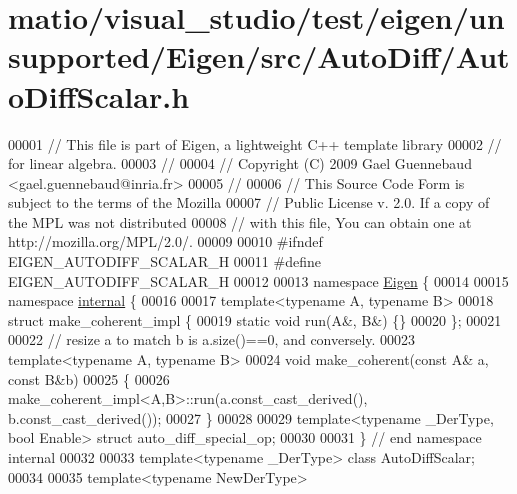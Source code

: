 \hypertarget{matio_2visual__studio_2test_2eigen_2unsupported_2_eigen_2src_2_auto_diff_2_auto_diff_scalar_8h_source}{}\section{matio/visual\+\_\+studio/test/eigen/unsupported/\+Eigen/src/\+Auto\+Diff/\+Auto\+Diff\+Scalar.h}
\label{matio_2visual__studio_2test_2eigen_2unsupported_2_eigen_2src_2_auto_diff_2_auto_diff_scalar_8h_source}

\begin{DoxyCode}
00001 \textcolor{comment}{// This file is part of Eigen, a lightweight C++ template library}
00002 \textcolor{comment}{// for linear algebra.}
00003 \textcolor{comment}{//}
00004 \textcolor{comment}{// Copyright (C) 2009 Gael Guennebaud <gael.guennebaud@inria.fr>}
00005 \textcolor{comment}{//}
00006 \textcolor{comment}{// This Source Code Form is subject to the terms of the Mozilla}
00007 \textcolor{comment}{// Public License v. 2.0. If a copy of the MPL was not distributed}
00008 \textcolor{comment}{// with this file, You can obtain one at http://mozilla.org/MPL/2.0/.}
00009 
00010 \textcolor{preprocessor}{#ifndef EIGEN\_AUTODIFF\_SCALAR\_H}
00011 \textcolor{preprocessor}{#define EIGEN\_AUTODIFF\_SCALAR\_H}
00012 
00013 \textcolor{keyword}{namespace }\hyperlink{namespace_eigen}{Eigen} \{
00014 
00015 \textcolor{keyword}{namespace }\hyperlink{namespaceinternal}{internal} \{
00016 
00017 \textcolor{keyword}{template}<\textcolor{keyword}{typename} A, \textcolor{keyword}{typename} B>
00018 \textcolor{keyword}{struct }make\_coherent\_impl \{
00019   \textcolor{keyword}{static} \textcolor{keywordtype}{void} run(A&, B&) \{\}
00020 \};
00021 
00022 \textcolor{comment}{// resize a to match b is a.size()==0, and conversely.}
00023 \textcolor{keyword}{template}<\textcolor{keyword}{typename} A, \textcolor{keyword}{typename} B>
00024 \textcolor{keywordtype}{void} make\_coherent(\textcolor{keyword}{const} A& a, \textcolor{keyword}{const} B&b)
00025 \{
00026   make\_coherent\_impl<A,B>::run(a.const\_cast\_derived(), b.const\_cast\_derived());
00027 \}
00028 
00029 \textcolor{keyword}{template}<\textcolor{keyword}{typename} \_DerType, \textcolor{keywordtype}{bool} Enable> \textcolor{keyword}{struct }auto\_diff\_special\_op;
00030 
00031 \} \textcolor{comment}{// end namespace internal}
00032 
00033 \textcolor{keyword}{template}<\textcolor{keyword}{typename} \_DerType> \textcolor{keyword}{class }AutoDiffScalar;
00034 
00035 \textcolor{keyword}{template}<\textcolor{keyword}{typename} NewDerType>

\end{DoxyCode}
